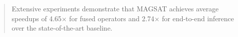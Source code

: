 \documentclass[sigconf,review, anonymous]{acmart}
\begin{document}
\begin{abstract}
Extensive experiments demonstrate
that MAGSAT achieves average speedups of 4.65$\times$ for fused operators and 2.74$\times$ for end-to-end inference
over the state-of-the-art baseline.
%
\end{abstract}






\maketitle






\end{document}
